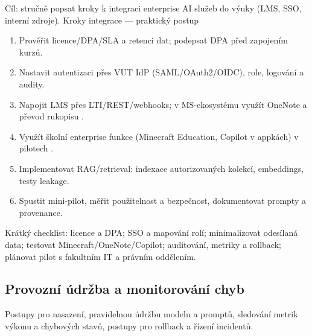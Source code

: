 \documentclass{report}%
\begin{document}
%
Cíl: stručně popsat kroky k integraci enterprise AI služeb do výuky (LMS, SSO, interní zdroje).
Kroky integrace — praktický postup
\begin{enumerate}
\item Prověřit licence/DPA/SLA a retenci dat; podepsat DPA před zapojením kurzů.
\item Nastavit autentizaci přes VUT IdP (SAML/OAuth2/OIDC), role, logování a audity.
\item Napojit LMS přes LTI/REST/webhooks; v MS‑ekosystému využít OneNote a převod rukopisu \cite{kb_ai_101_tipu_pdf_04e4a115_page_8_1}.
\item Využít školní enterprise funkce (Minecraft Education, Copilot v appkách) v pilotech \cite{kb_ai_101_tipu_pdf_04e4a115_page_15_2, kb_ai_101_tipu_pdf_04e4a115_page_53_1}.
\item Implementovat RAG/retrieval: indexace autorizovaných kolekcí, embeddings, testy leakage.
\item Spustit mini‑pilot, měřit použitelnost a bezpečnost, dokumentovat prompty a provenance.
\end{enumerate}
Krátký checklist: licence a DPA; SSO a mapování rolí; minimalizovat odesílaná data; testovat Minecraft/OneNote/Copilot; auditování, metriky a rollback; plánovat pilot s fakultním IT a právním oddělením.%

%
\subsection{Provozní údržba a monitorování chyb}%
Postupy pro nasazení, pravidelnou údržbu modelu a promptů, sledování metrik výkonu a chybových stavů, postupy pro rollback a řízení incidentů.%
\end{document}
